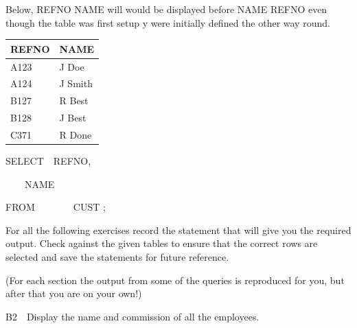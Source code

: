 Below, REFNO NAME will would be displayed before NAME REFNO even though the table was first setup y were initially defined the other way round.  



\begin{center}
\begin{minipage}{5.191cm}
\begin{flushleft}
\tablefirsthead{}
\tablehead{}
\tabletail{}
\tablelasttail{}
\begin{supertabular}{|m{2.2389998cm}|m{2.55cm}|}
\hline
REFNO &
NAME\\\hline
A123 &
J Doe\\
A124 &
J Smith\\
B127 &
R Best\\
B128 &
J Best\\
C371 &
R Done\\\hline
\end{supertabular}
\end{flushleft}
\end{minipage}
\end{center}
SELECT\ \ REFNO,

\ \ \ \ NAME 

FROM\ \ \ \ \ \ \ \ CUST ;

For all the following exercises record the statement that will give you the required output.  Check against the given tables to ensure that the correct rows are selected and save the statements for future reference. 

(For each section the output from some of the queries is reproduced for you, but after that you are on your own!)

B2\ \ Display the name and commission of all the employees.



